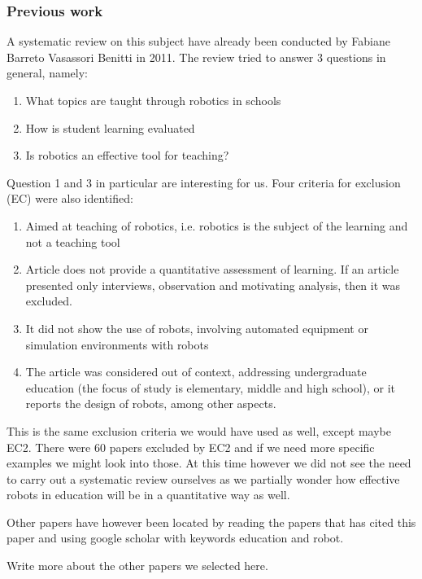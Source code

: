 \subsubsection{Previous work}
A systematic review on this subject have already been conducted by Fabiane Barreto Vasassori Benitti in 2011\cite{Benitti2012978}. The review tried to answer 3 questions in general, namely:
\begin{enumerate}
  \item What topics are taught through robotics in schools
  \item How is student learning evaluated
  \item Is robotics an effective tool for teaching?
\end{enumerate}

\bigskip\noindent
Question 1 and 3 in particular are interesting for us. 
Four criteria for exclusion (EC) were also identified:

\begin{enumerate}
  \item Aimed at teaching of robotics, i.e. robotics is the subject of the learning and not a teaching tool
  \item Article does not provide a quantitative assessment of learning. If an article presented only interviews, observation and motivating
analysis, then it was excluded.
  \item It did not show the use of robots, involving automated equipment or simulation environments with robots
	\item The article was considered out of context, addressing undergraduate education (the focus of study is elementary, middle and high
school), or it reports the design of robots, among other aspects.
\end{enumerate}

\bigskip\noindent
This is the same exclusion criteria we would have used as well, except maybe EC2. There were 60 papers excluded by EC2 and if we need more specific examples we might look into those. At this time however we did not see the need to carry out a systematic review ourselves as we partially wonder how effective robots in education will be in a quantitative way as well. 

\bigskip\noindent
Other papers have however been located by reading the papers that has cited this paper and using google scholar with keywords education and robot. 

\bigskip\noindent
Write more about the other papers we selected here.

